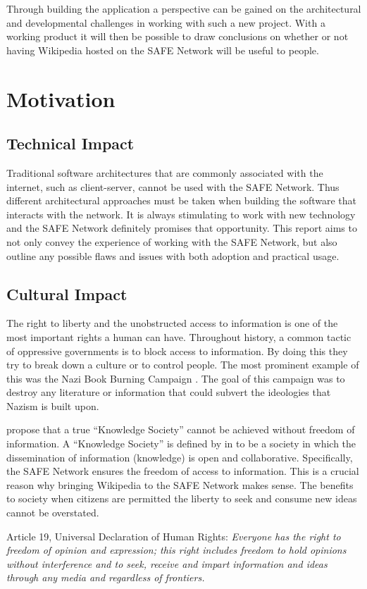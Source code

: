 Through building the application a perspective can be gained on the architectural and developmental challenges in working with such a new project. With a working product it will then be possible to draw conclusions on whether or not having Wikipedia hosted on the SAFE Network will be useful to people.

\section{Motivation}

\subsection{Technical Impact}

Traditional software architectures that are commonly associated with the internet, such as client-server, cannot be used with the SAFE Network. Thus different architectural approaches must be taken when building the software that interacts with the network. It is always stimulating to work with new technology and the SAFE Network definitely promises that opportunity. This report aims to not only convey the experience of working with the SAFE Network, but also outline any possible flaws and issues with both adoption and practical usage.

\subsection{Cultural Impact}

The right to liberty and the unobstructed access to information is one of the most important rights a human can have. Throughout history, a common tactic of oppressive governments is to block access to information. By doing this they try to break down a culture or to control people. The most prominent example of this was the Nazi Book Burning Campaign \cite{book-burning}. The goal of this campaign was to destroy any literature or information that could subvert the ideologies that Nazism is built upon.

\citeauthor{doi:10.1177/0165551506075327} propose that a true ``Knowledge Society'' cannot be achieved without freedom of information\cite{doi:10.1177/0165551506075327}. A ``Knowledge Society'' is defined by \citeauthor{binde2005towards} in \cite{binde2005towards} to be a society in which the dissemination of information (knowledge) is open and collaborative. Specifically, the SAFE Network ensures the freedom of access to information. This is a crucial reason why bringing Wikipedia to the SAFE Network makes sense. The benefits to society when citizens are permitted the liberty to seek and consume new ideas cannot be overstated.

\begin{displayquote}
Article 19, Universal Declaration of Human Rights\cite{assembly1948universal}: \textit{Everyone has the right to freedom of opinion and expression; this right includes freedom to hold opinions without interference and to seek, receive and impart information and ideas through any media and regardless of frontiers.}
\end{displayquote}
